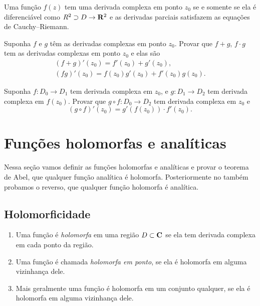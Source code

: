\begin{teorema}
Uma função $f(z)$ tem uma derivada complexa em ponto $z_0$ se e somente se
ela é diferenciável como $R^2\supset D \to \mathbf{R}^2$ e as derivadas parciais
satisfazem as equações de Cauchy--Riemann.
\end{teorema}

\begin{problema}
Suponha $f$ e $g$ têm as derivadas complexas em ponto $z_0$.
Provar que $f+g$, $f\cdot g$ tem as derivadas complexas em ponto $z_0$
e elas são
\begin{gather}
(f+g)'(z_0) = f'(z_0)+g'(z_0), \\
(fg)'(z_0) = f(z_0) g'(z_0) + f'(z_0) g(z_0).
\end{gather}
\end{problema}

\begin{problema}
Suponha $f: D_0 \to D_1$ tem derivada complexa em $z_0$,
e $g : D_1 \to D_2$ tem derivada complexa em $f(z_0)$.
Provar que $g\circ f: D_0 \to D_2$ tem derivada complexa em $z_0$
e
\begin{equation}
(g\circ f)'(z_0) = g'(f(z_0)) \cdot f'(z_0).
\end{equation} 
\end{problema}

\section{Funções holomorfas e analíticas}
Nessa seção vamos definir as funções holomorfas e analíticas
e provar o teorema de Abel, que qualquer função analítica é holomorfa.
Posteriormente no  também probamos o reverso,
que qualquer função holomorfa é analítica.

\subsection{Holomorficidade}

\begin{defin} 
\begin{enumerate}
\item Uma função é \emph{holomorfa} em uma região $D\subset\mathbf{C}$ se ela tem derivada complexa em cada ponto da região.
\item Uma função é chamada \emph{holomorfa em ponto}, se ela é holomorfa em alguma vizinhança dele.
\item Mais geralmente uma função é holomorfa em um conjunto qualquer, se ela é holomorfa em alguma vizinhança dele.
\end{enumerate}
\end{defin}

